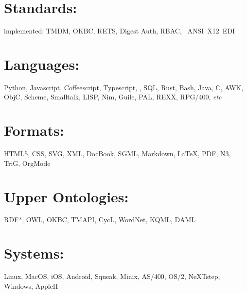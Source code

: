\documentclass[line,margin,hidelinks]{res}
\begin{document}
\begin{resume}
\section{Standards:}
\begin{par}
implemented:
TMDM,
OKBC,
RETS,
Digest Auth,
RBAC,
~ANSI~X12~EDI
\end{par}

\section{Languages:}
\begin{par}
  Python, Javascript, Coffeescript, Typescript, \PS, SQL, Rust, Bash,
  Java, C, AWK, ObjC, Scheme, Smalltalk, LISP, Nim, Guile, PAL, REXX, RPG/400,
  \textit{etc}
\end{par}

\section{Formats:}
\begin{par}
  \small{HTML5, CSS, SVG, XML, DocBook, SGML, Markdown, \LaTeX, PDF, N3, TriG, OrgMode}
\end{par}

\section{\footnotesize{Upper Ontologies:}}
\begin{par}
  RDF*, OWL, OKBC, TMAPI, CycL, WordNet, KQML, DAML
\end{par}


% 


\section{Systems:}
\begin{par}
  \small{Linux, MacOS, iOS, Android, Squeak, Minix,
    AS/400, OS/2, NeXTstep, Windows, AppleII}
\end{par}


\end{resume}
\end{document}
